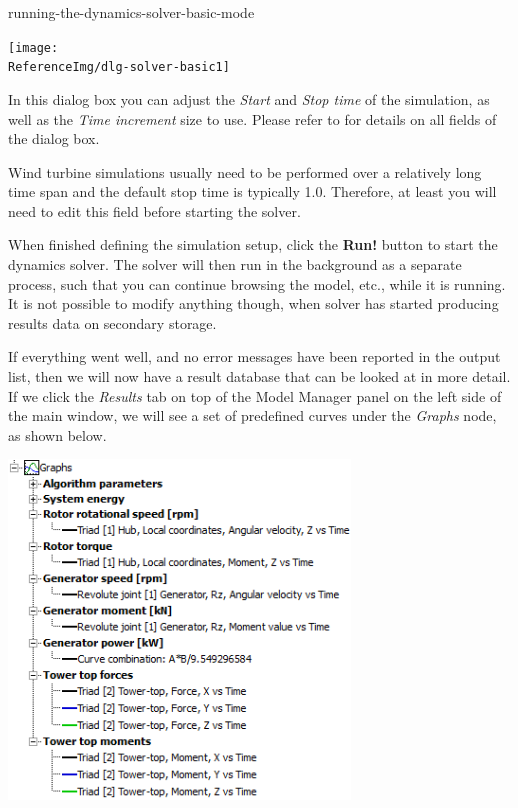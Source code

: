 \clearpage

           {running-the-dynamics-solver-basic-mode}


\texttt{[image: \\ReferenceImg/dlg-solver-basic1]}

In this dialog box you can adjust the {\sl Start} and {\sl Stop time}
of the simulation, as well as the {\sl Time increment} size to use.
Please refer to
for details on all fields of the dialog box.

Wind turbine simulations usually need to be performed over a relatively long
time span and the default stop time is typically 1.0. Therefore, at least
you will need to edit this field before starting the solver.

When finished defining the simulation setup, click the \textbf{Run!} button
to start the dynamics solver. The solver will then run in the background as
a separate process, such that you can continue browsing the model, etc.,
while it is running. It is not possible to modify anything though,
when solver has started producing results data on secondary storage.



If everything went well,
and no error messages have been reported in the output list,
then we will now have a result database that can be looked at in more detail.
If we click the {\sl Results} tab on top of the Model Manager panel on the left
side of the main window, we will see a set of predefined curves under the
{\sl Graphs} node, as shown below.

\includegraphics[width=0.68\textwidth]{Figures/3b-Graphs1}

